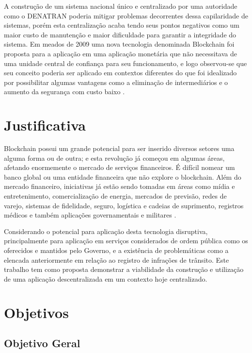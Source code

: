A construção de um sistema nacional único e centralizado por uma autoridade como o DENATRAN poderia mitigar problemas decorrentes dessa capilaridade de sistemas, porém esta centralização acaba tendo seus pontos negativos como um maior custo de manutenção e maior dificuldade para garantir a integridade do sistema. Em meados de 2009 uma nova tecnologia denominada Blockchain foi proposta para a aplicação em uma aplicação monetária que não necessitava de uma unidade central de confiança para seu funcionamento, e logo observou-se que seu conceito poderia ser aplicado em contextos diferentes do que foi idealizado por possibilitar algumas vantagens como a eliminação de intermediários e o aumento da segurança com custo baixo \cite{beginnig_blockchain_bikramaditya}.


\section{Justificativa}

Blockchain possui um grande potencial para ser inserido diversos setores uma alguma forma ou de outra; e esta revolução já começou em algumas áreas, afetando enormemente o mercado de serviços financeiros. É difícil nomear um banco global ou uma entidade financeira que não explore o blockchain. Além do mercado financeiro, iniciativas já estão sendo tomadas em áreas como mídia e entretenimento, comercialização de energia, mercados de previsão, redes de varejo, sistemas de fidelidade, seguro, logística e cadeias de suprimento, registros médicos e também aplicações governamentais e militares \cite{beginnig_blockchain_bikramaditya}.

Considerando o potencial para aplicação desta tecnologia disruptiva, principalmente para aplicação em serviços considerados de ordem pública como os oferecidos e mantidos pelo Governo, e a existência de problemáticas como a elencada anteriormente em relação ao registro de infrações de trânsito. Este trabalho tem como proposta demonstrar a viabilidade da construção e utilização de uma aplicação descentralizada em um contexto hoje centralizado.

\section{Objetivos}

    \subsection{Objetivo Geral}
    
